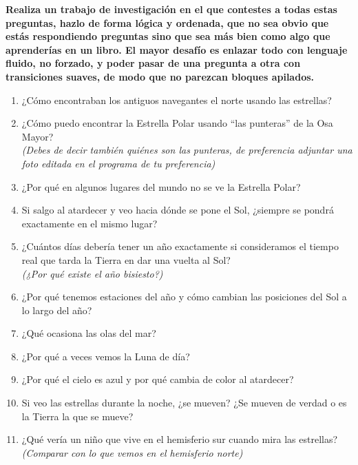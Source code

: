 \documentclass{article}
\theoremstyle{nonumberplain}
\begin{document}
\textbf{Realiza un trabajo de investigación en el que contestes a todas estas preguntas, hazlo de forma lógica y ordenada, que no sea obvio que estás respondiendo preguntas sino que sea más bien como algo que aprenderías en un libro. El mayor desafío es enlazar todo con lenguaje fluido, no forzado, y poder pasar de una pregunta a otra con transiciones suaves, de modo que no parezcan bloques apilados.}

\begin{enumerate}
    \item[\textbf{I.}] ¿Cómo encontraban los antiguos navegantes el norte usando las estrellas?
    
    \item[\textbf{II.}] ¿Cómo puedo encontrar la Estrella Polar usando ``las punteras'' de la Osa Mayor?\\
    \textit{(Debes de decir también quiénes son las punteras, de preferencia adjuntar una foto editada en el programa de tu preferencia)}
    
    \item[\textbf{III.}] ¿Por qué en algunos lugares del mundo no se ve la Estrella Polar?
    
    \item[\textbf{IV.}] Si salgo al atardecer y veo hacia dónde se pone el Sol, ¿siempre se pondrá exactamente en el mismo lugar?
    
    \item[\textbf{V.}] ¿Cuántos días debería tener un año exactamente si consideramos el tiempo real que tarda la Tierra en dar una vuelta al Sol?\\
    \textit{(¿Por qué existe el año bisiesto?)}
    
    \item[\textbf{VI.}] ¿Por qué tenemos estaciones del año y cómo cambian las posiciones del Sol a lo largo del año?
    
    \item[\textbf{VII.}] ¿Qué ocasiona las olas del mar?
    
    \item[\textbf{VIII.}] ¿Por qué a veces vemos la Luna de día?
    
    \item[\textbf{IX.}] ¿Por qué el cielo es azul y por qué cambia de color al atardecer?
    
    \item[\textbf{X.}] Si veo las estrellas durante la noche, ¿se mueven? ¿Se mueven de verdad o es la Tierra la que se mueve?
    
    \item[\textbf{XI.}] ¿Qué vería un niño que vive en el hemisferio sur cuando mira las estrellas?\\
    \textit{(Comparar con lo que vemos en el hemisferio norte)}
\end{enumerate}
\end{document}
